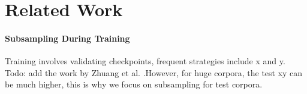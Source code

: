 \section{Related Work}

\paragraph{Subsampling During Training}

Training involves validating checkpoints, frequent strategies include x and y. Todo: add the work by Zhuang et al. \cite{zhuang:2022}.However, for huge corpora, the test xy can be much higher, this is why we focus on subsampling for test corpora.

